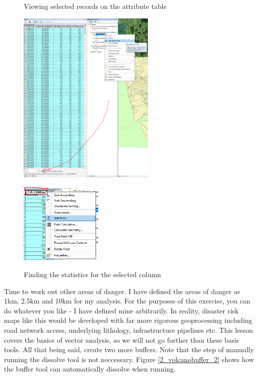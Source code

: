 \documentclass{article}
\begin{document}
\begin{figure}[h]
  \centering
  \begin{minipage}[b]{0.5\textwidth}
    \centering
    \caption{Viewing selected records on the attribute table}
    \includegraphics[width=250px]{images/part2/viewattributetable.PNG}
    \label{2_viewattributetable}
  \end{minipage}
  \hfill
  \begin{minipage}[b]{0.4\textwidth}
    \centering
    \caption{Finding the statistics for the selected column}
    \includegraphics[width=150px]{images/part2/viewattribute_statistics.PNG}
    \label{2_viewattribute_statistics}
  \end{minipage}
\end{figure}

Time to work out other areas of danger. I have defined the areas of danger as 1km, 2.5km and 10km for my analysis. For the purposes of this exercise, you can do whatever you like - I have defined mine arbitrarily. In reality, disaster risk maps like this would be developed with far more rigorous geoprocessing including road network access, underlying lithology, infrastructure pipelines etc. This lesson covers the basics of vector analysis, so we will not go further than these basic tools. All that being said, create two more buffers. Note that the step of manually running the dissolve tool is not neccessary. Figure \ref{2_volcanobuffer_2} shows how the buffer tool can automatically dissolve when running.
\pagebreak
\end{document}
